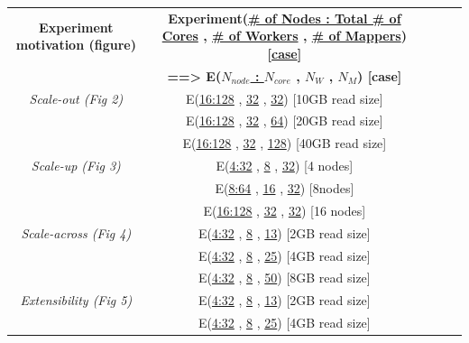 \documentclass{acm_proc_article-sp}
\begin{document}


\begin{center}
\begin{table}[ht]
\small
\hfill{}
 \begin{tabular}{|c|c|c|c|c|} 
 \hline 
 \textbf{Experiment motivation (figure) } &  \textbf{Experiment(\underline{\# of  Nodes : Total \# of Cores} , \underline{\# of Workers} , \underline{\# of Mappers}) [\underline{case}]}  \\
&\textbf{==> E(\underline{$N_{node}$ : $N_{core}$} , \underline{$N_W$} ,  \underline{$N_M$}) [case]}  \\
 \hline
  \hline
\it{Scale-out} (Fig 2) & E(\underline{16:128} , \underline{32} , \underline{32}) [10GB read size] \\
&E(\underline{16:128} , \underline{32} , \underline{64}) [20GB read size]\\
&E(\underline{16:128} , \underline{32} , \underline{128}) [40GB read size]\\
\hline
\it{Scale-up} (Fig 3) & E(\underline{4:32} , \underline{8} , \underline{32}) [4 nodes]\\
&E(\underline{8:64} , \underline{16} , \underline{32}) [8nodes]\\
&E(\underline{16:128} , \underline{32} , \underline{32}) [16 nodes]\\
\hline
\it{Scale-across} (Fig 4) & E(\underline{4:32} , \underline{8} , \underline{13}) [2GB read size] \\
&E(\underline{4:32} , \underline{8} , \underline{25}) [4GB read size]\\
&E(\underline{4:32} , \underline{8} , \underline{50}) [8GB read size] \\
\hline
\it{Extensibility} (Fig 5) & E(\underline{4:32} , \underline{8} , \underline{13}) [2GB read size]\\
&E(\underline{4:32} , \underline{8} , \underline{25}) [4GB read size] \\

\end{tabular}
\end{table}
\end{center}
\end{document}

